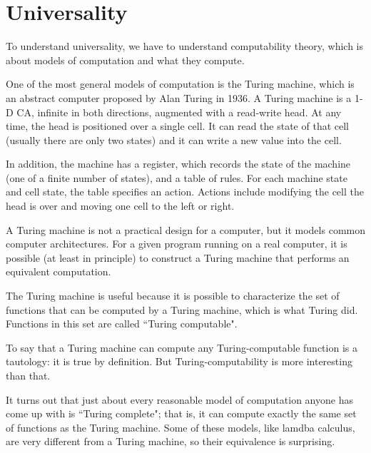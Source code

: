 \documentclass[12pt]{book}
\theoremstyle{exercise}
\begin{document}
\section{Universality}

To understand universality, we have to understand computability
theory, which is about models of computation and what they compute.


One of the most general models of computation is the Turing machine,
which is an abstract computer proposed by Alan Turing in 1936.  A
Turing machine is a 1-D CA, infinite in both directions, augmented
with a read-write head.  At any time, the head is positioned over a
single cell.  It can read the state of that cell (usually there are
only two states) and it can write a new value into the cell.


In addition, the machine has a register, which records the state
of the machine (one of a finite number of states), and a table
of rules.  For each machine state and cell state, the table
specifies an action.  Actions include modifying the cell
the head is over and moving one cell to the left or right.


A Turing machine is not a practical design for a computer, but it
models common computer architectures.  For a given program running on
a real computer, it is possible (at least in principle) to construct a
Turing machine that performs an equivalent computation.

The Turing machine is useful because it is possible to characterize
the set of functions that can be computed by a Turing machine,
which is what Turing did.  Functions in this set are
called ``Turing computable".


To say that a Turing machine can compute any Turing-computable
function is a tautology: it is true by definition.  But
Turing-computability is more interesting than that.


It turns out that just about every reasonable model of computation
anyone has come up with is ``Turing complete"; that is, it can compute
exactly the same set of functions as the Turing machine.
Some of these models, like lamdba calculus, are very different
from a Turing machine, so their equivalence is surprising.
\end{document}
